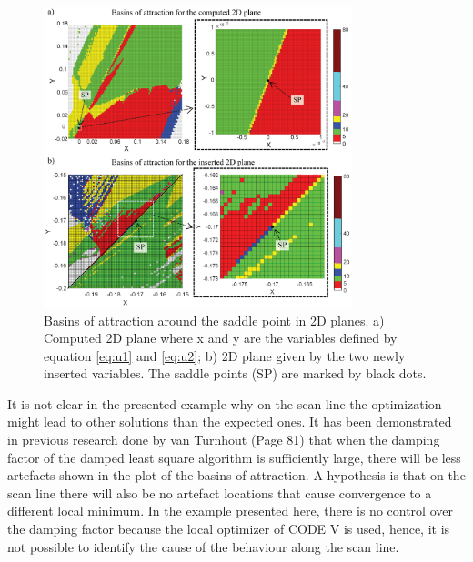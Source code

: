 \begin{figure}[h!]
    \centering
    \includegraphics[width=0.8\textwidth]{chapter-4/figures/Basins_two_situations.png}
    \caption{Basins of attraction around the saddle point in 2D planes. a) Computed 2D plane where x and y are the variables defined by equation \ref{eq:u1} and \ref{eq:u2}; b) 2D plane given by the two newly inserted variables. The saddle points (SP) are marked by black dots.}
    \label{fig:basins}
\end{figure}

It is not clear in the presented example why on the scan line the optimization might lead to other solutions than the expected ones. It has been demonstrated in previous research done by van Turnhout \cite{vanTurnhoutThesis2009} (Page 81)\cite{vanTurnhout2009_landscape_instab} that when the damping factor of the damped least square algorithm is sufficiently large, there will be less artefacts shown in the plot of the basins of attraction. A hypothesis is that on the scan line there will also be no artefact locations that cause convergence to a different local minimum. In the example presented here, there is no control over the damping factor because the local optimizer of CODE V is used, hence, it is not possible to identify the cause of the behaviour along the scan line. 

